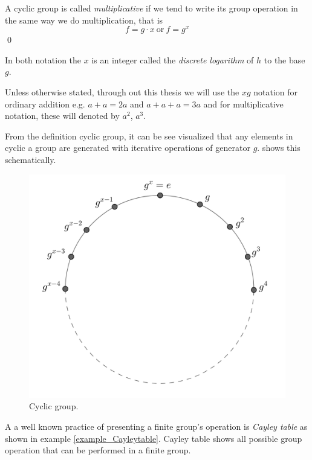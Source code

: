 \begin{definition}
	A cyclic group is called \textit{multiplicative} if we tend to write its group operation in the same way we do multiplication, that is 
	$$f =  g \cdot x ~\text{or}~ f = g^x$$ 
	\qed
\end{definition}

\begin{remark}
	In both notation the $x$  is an integer called the \textit{discrete logarithm} of $h$ to the base $g$.
\end{remark}
\begin{remark}
	Unless otherwise stated, through out this thesis we will use the $xg$ notation for ordinary addition e.g. $a+a=2a$ and $a+a+a=3a$ and for multiplicative notation, these will denoted by $a^2$, $a^3$.
\end{remark}

From the definition cyclic group, it can be see visualized that any elements in cyclic a group are generated with iterative operations of generator $g$. 
 shows this schematically.
\begin{figure}[ht]
	\begin{center}
		\includegraphics[width=.6\linewidth, height=.67\textheight, keepaspectratio]{Figures/cyclicgroup}
		\caption{Cyclic group.}
		\label{Cyclic group}
	\end{center}
\end{figure}

A a well known practice of presenting a finite group's operation is {\em Cayley table} as shown in example \ref{example_Cayleytable}.
Cayley table shows all possible group operation that can be performed in a finite group.

